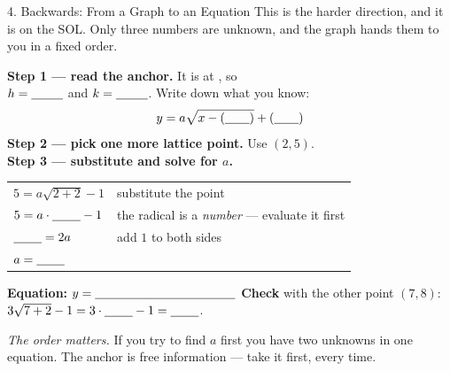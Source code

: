 \documentclass[10pt]{article}
\newcommand{\lgrid}[4]{%
  \draw[step=1, linegray!40, very thin] (#1,#3) grid (#2,#4);
  \draw[->, semithick, charcoal] (#1,0)--(#2,0) node[below right, font=\scriptsize]{$x$};
  \draw[->, semithick, charcoal] (0,#3)--(0,#4) node[left, font=\scriptsize]{$y$};}
\begin{document}
\begin{notesbox}{4. Backwards: From a Graph to an Equation}
This is the harder direction, and it is on the SOL. Only three numbers are unknown, and the graph
hands them to you in a fixed order.
\begin{center}
\begin{minipage}[c]{0.48\linewidth}
\centering
{}
\end{minipage}
\begin{minipage}[c]{0.48\linewidth}
\small
\textbf{Step 1 --- read the anchor.} It is at \blank{1.8cm}, so \\[2pt]
$h=\blank{0.9cm}$ and $k=\blank{0.9cm}$. Write down what you know:
\[ y=a\sqrt{x-(\blank{0.7cm})}+(\blank{0.7cm}) \]
\textbf{Step 2 --- pick one more lattice point.} Use $(2,5)$. \\[2pt]
\textbf{Step 3 --- substitute and solve for $a$.}
\end{minipage}
\end{center}
\vspace{-4pt}
\begin{center}
\renewcommand{\arraystretch}{1.7}
\begin{tabular}{@{}l l@{}}
$5=a\sqrt{2+2}-1$ & substitute the point \\
$5=a\cdot\blank{0.8cm}-1$ & the radical is a \emph{number} --- evaluate it first \\
$\blank{0.8cm}=2a$ & add $1$ to both sides \\
$a=\blank{0.8cm}$ & \\
\end{tabular}
\end{center}
\textbf{Equation:} $y=\blank{4.0cm}$ \quad \textbf{Check} with the other point $(7,8)$:
$3\sqrt{7+2}-1=3\cdot\blank{0.8cm}-1=\blank{0.8cm}$. \; \checkmark
\vspace{3pt}

\emph{The order matters.} If you try to find $a$ first you have two unknowns in one equation. The
anchor is free information --- take it first, every time.
\end{notesbox}
\end{document}
